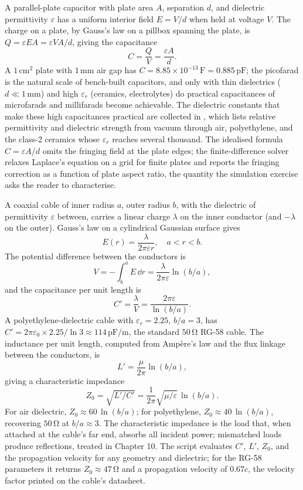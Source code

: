 A parallel-plate capacitor with plate area $A$, separation $d$, and
dielectric permittivity $\varepsilon$ has a uniform interior field
$E = V/d$ when held at voltage $V$. The charge on a plate, by Gauss's
law on a pillbox spanning the plate, is $Q = \varepsilon E A =
\varepsilon V A/d$, giving the capacitance
\[
C = \frac{Q}{V} = \frac{\varepsilon A}{d}.
\]
A $1\,\si{\centi\meter\squared}$ plate with $1\,\si{\milli\meter}$
air gap has $C = 8.85\times 10^{-13}\,\si{\farad} = 0.885\,\si{\pico
\farad}$; the picofarad is the natural scale of bench-built
capacitors, and only with thin dielectrics ($d \ll 1\,\si{\milli
\meter}$) and high $\varepsilon_{r}$ (ceramics, electrolytes) do
practical capacitances of microfarads and millifarads become
achievable. The dielectric constants that make these high capacitances
practical are collected in ,
which lists relative permittivity and dielectric strength from vacuum
through air, polyethylene, and the class-2 ceramics whose
$\varepsilon_r$ reaches several thousand. The idealised formula
$C = \varepsilon A/d$ omits the fringing field at the plate edges; the
finite-difference solver  relaxes
Laplace's equation on a grid for finite plates and reports the fringing
correction as a function of plate aspect ratio, the quantity the
simulation exercise asks the reader to characterise.



A coaxial cable of inner radius $a$, outer radius $b$, with the
dielectric of permittivity $\varepsilon$ between, carries a linear
charge $\lambda$ on the inner conductor (and $-\lambda$ on the outer).
Gauss's law on a cylindrical Gaussian surface gives
\[
E(r) = \frac{\lambda}{2\pi \varepsilon r}, \quad a<r<b.
\]
The potential difference between the conductors is
\[
V = -\int_{b}^{a} E\,\dd r = \frac{\lambda}{2\pi \varepsilon}\ln(b/a),
\]
and the capacitance per unit length is
\[
C' = \frac{\lambda}{V} = \frac{2\pi \varepsilon}{\ln(b/a)}.
\]
A polyethylene-dielectric cable with $\varepsilon_{r} = 2.25$, $b/a =
3$, has $C' = 2\pi\varepsilon_{0}\times 2.25/\ln 3 \approx 114\,\si{
\pico\farad\per\meter}$, the standard $50\,\si{\ohm}$ RG-58 cable.
The inductance per unit length, computed from Amp\`ere's law and the
flux linkage between the conductors, is
\[
L' = \frac{\mu}{2\pi}\ln(b/a),
\]
giving a characteristic impedance
\[
Z_{0} = \sqrt{L'/C'} = \frac{1}{2\pi}\sqrt{\mu/\varepsilon}\,\ln(b/a).
\]
For air dielectric, $Z_{0} \approx 60\,\ln(b/a)$; for polyethylene,
$Z_{0} \approx 40\,\ln(b/a)$, recovering $50\,\si{\ohm}$ at $b/a
\approx 3$. The characteristic impedance is the load that, when
attached at the cable's far end, absorbs all incident power; mismatched
loads produce reflections, treated in Chapter 10. The script
 evaluates $C'$, $L'$, $Z_0$, and the
propagation velocity for any geometry and dielectric; for the RG-58
parameters it returns $Z_0 \approx 47\,\si{\ohm}$ and a propagation
velocity of $0.67c$, the velocity factor printed on the cable's
datasheet.

